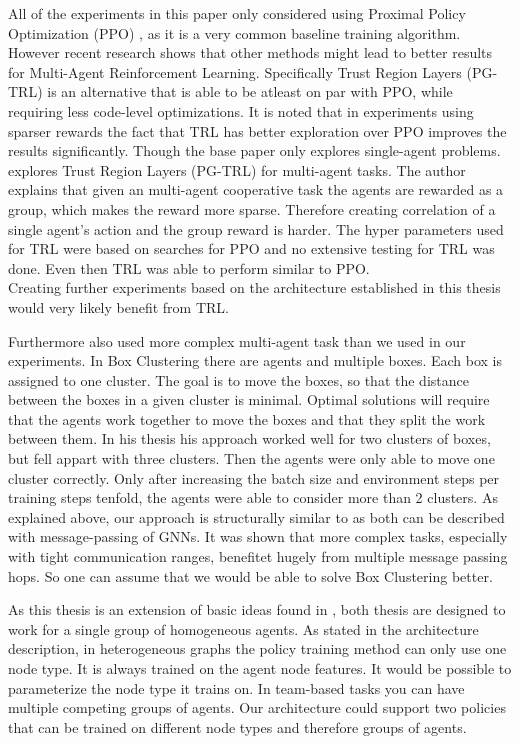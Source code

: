 All of the experiments in this paper only considered using Proximal Policy Optimization (PPO) \citet{SchulmanWDRK17}, as it is a very common baseline training algorithm.
However recent research shows that other methods might lead to better results for Multi-Agent Reinforcement Learning.
Specifically Trust Region Layers (PG-TRL) \citet{otto2021differentiable} is an alternative that is able to be atleast on par with PPO, while requiring less code-level optimizations. It is noted that in experiments using sparser rewards the fact that TRL has better exploration over PPO improves the results significantly. Though the base paper only explores single-agent problems.
\citet{RobinRuede2021} explores Trust Region Layers (PG-TRL) \citet{otto2021differentiable} for multi-agent tasks. The author explains that given an multi-agent cooperative task the agents are rewarded as a group, which makes the reward more sparse. Therefore creating correlation of a single agent's action and the group reward is harder. The hyper parameters used for TRL were based on searches for PPO and no extensive testing for TRL was done. Even then TRL was able to perform similar to PPO.\\
Creating further experiments based on the architecture established in this thesis would very likely benefit from TRL. \par

Furthermore \citet{RobinRuede2021} also used more complex multi-agent task than we used in our experiments. In Box Clustering there are agents and multiple boxes. Each box is assigned to one cluster. The goal is to move the boxes, so that the distance between the boxes in a given cluster is minimal. Optimal solutions will require that the agents work together to move the boxes and that they split the work between them. In his thesis his approach worked well for two clusters of boxes, but fell appart with three clusters. Then the agents were only able to move one cluster correctly. Only after increasing the batch size and environment steps per training steps tenfold, the agents were able to consider more than 2 clusters. As explained above, our approach is structurally similar to \citet{RobinRuede2021} as both can be described with message-passing of GNNs. It was shown that more complex tasks, especially with tight communication ranges, benefitet hugely from multiple message passing hops. So one can assume that we would be able to solve Box Clustering better.\par

As this thesis is an extension of basic ideas found in \citet{RobinRuede2021}, both thesis are designed to work for a single group of homogeneous agents. As stated in the architecture description, in heterogeneous graphs the policy training method can only use one node type. It is always trained on the agent node features. It would be possible to parameterize the node type it trains on. In team-based tasks you can have multiple competing groups of agents. Our architecture could support two policies that can be trained on different node types and therefore groups of agents. \par

